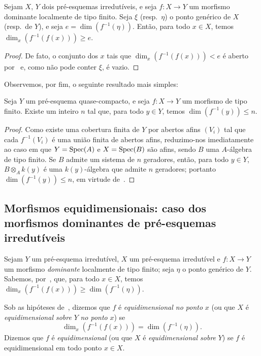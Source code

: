 \begin{corollary}[13.1.6]
\label{IV.13.1.6}
Sejam $X$, $Y$ dois pré-esquemas irredutíveis,
e seja $f:X\to Y$ um morfismo dominante localmente de tipo finito.
Seja $\xi$ (resp.\ $\eta$) o ponto genérico de $X$ (resp.\ de $Y$),
e seja $e=\dim(f^{-1}(\eta))$.
Então, para todo $x\in X$, temos $\dim_x(f^{-1}(f(x)))\geq e$.
\end{corollary}

\begin{proof}
De fato, o conjunto dos $x$ tais que $\dim_x(f^{-1}(f(x)))<e$
é aberto por~ e, como não pode conter $\xi$, é vazio.
\end{proof}

Observemos, por fim, o seguinte resultado mais simples:

\begin{proposition}[13.1.7]
\label{IV.13.1.7}
Seja $Y$ um pré-esquema quase-compacto,
e seja $f:X\to Y$ um morfismo de tipo finito.
Existe um inteiro $n$ tal que, para todo $y\in Y$,
temos $\dim(f^{-1}(y))\leq n$.
\end{proposition}

\begin{proof}
Como existe uma cobertura finita de $Y$ por abertos afins $(V_i)$
tal que cada $f^{-1}(V_i)$ é uma união finita de abertos afins,
reduzimo-nos imediatamente ao caso em que $Y=\operatorname{Spec}(A)$ e $X=\operatorname{Spec}(B)$
são afins, sendo $B$ uma $A$-álgebra de tipo finito.
Se $B$ admite um sistema de $n$ geradores, então, para todo $y\in Y$,
$B\otimes_A k(y)$ é uma $k(y)$-álgebra que admite $n$ geradores;
portanto $\dim(f^{-1}(y))\leq n$, em virtude de~.
\end{proof}

\subsection{Morfismos equidimensionais: caso dos morfismos dominantes de pré-esquemas irredutíveis}
\label{subsection:IV.13.2}

\begin{env}[13.2.1]
\label{IV.13.2.1}
Sejam $Y$ um pré-esquema irredutível, $X$ um pré-esquema irredutível
e $f:X\to Y$ um morfismo \emph{dominante} localmente de tipo finito;
seja $\eta$ o ponto genérico de $Y$.
Sabemos, por~, que, para todo $x\in X$,
temos $\dim_x(f^{-1}(f(x)))\geq\dim(f^{-1}(\eta))$.
\end{env}

\begin{definition}[13.2.2]
\label{IV.13.2.2}
Sob as hipóteses de~, dizemos que $f$ é
\emph{equidimensional no ponto} $x$ (ou que $X$ é \emph{equidimensional sobre}
$Y$ \emph{no ponto} $x$) se
\[
  \dim_x(f^{-1}(f(x)))=\dim(f^{-1}(\eta)).
\]
Dizemos que $f$ é \emph{equidimensional} (ou que $X$ é
\emph{equidimensional sobre} $Y$) se $f$ é equidimensional em todo ponto $x\in X$.
\end{definition}

